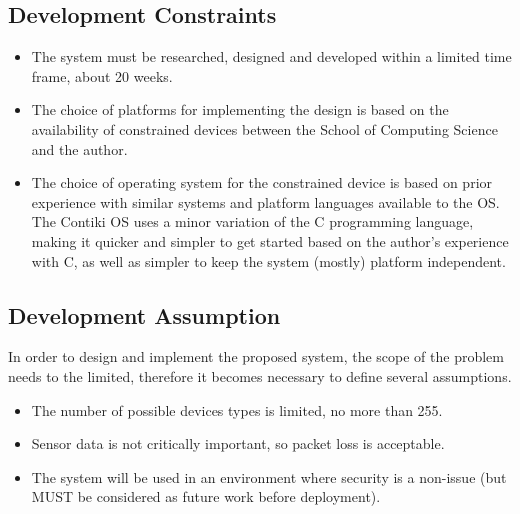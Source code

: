 
\subsection{Development Constraints} %
\label{sub:development_requirements}
\begin{itemize}
	\item The system must be researched, designed and developed within a limited time frame, about 20 weeks.
	\item The choice of platforms for implementing the design is based on the availability of constrained devices between the School of Computing Science and the author.
	\item The choice of operating system for the constrained device is based on prior experience with similar systems and platform languages available to the OS. The Contiki OS uses a minor variation of the C programming language, making it quicker and simpler to get started based on the author's experience with C, as well as simpler to keep the system (mostly) platform independent.
\end{itemize}
\subsection{Development Assumption} %
\label{sub:development_assumption}
In order to design and implement the proposed system, the scope of the problem needs to the limited, therefore it becomes necessary to define several assumptions.
\begin{itemize}
	\item The number of possible devices types is limited, no more than 255.
	\item Sensor data is not critically important, so packet loss is acceptable.
	\item The system will be used in an environment where security is a non-issue (but MUST be considered as future work before deployment).
\end{itemize}







